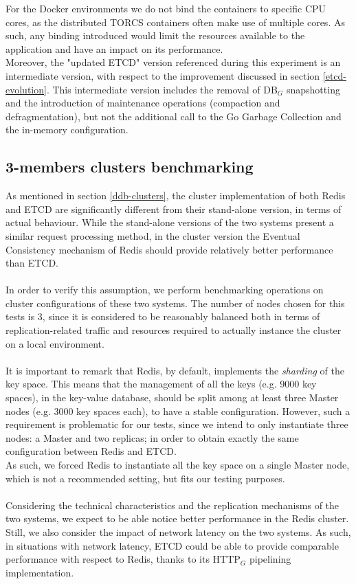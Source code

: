 For the Docker environments we do not bind the containers to specific CPU cores, as the distributed TORCS containers often make use of multiple cores. As such, any binding introduced would limit the resources available to the application and have an impact on its performance. \\
Moreover, the "updated ETCD" version referenced during this experiment is an intermediate version, with respect to the improvement discussed in section \ref{etcd-evolution}. This intermediate version includes the removal of DB$_G$ snapshotting and the introduction of maintenance operations (compaction and defragmentation), but not the additional call to the Go Garbage Collection and the in-memory configuration.

\subsection{3-members clusters benchmarking}\label{benchmarking}
As mentioned in section \ref{ddb-clusters}, the cluster implementation of both Redis and ETCD are significantly different from their stand-alone version, in terms of actual behaviour. While the stand-alone versions of the two systems present a similar request processing method, in the cluster version the Eventual Consistency mechanism of Redis should provide relatively better performance than ETCD. \\ \\
In order to verify this assumption, we perform benchmarking operations on cluster configurations of these two systems. The number of nodes chosen for this tests is 3, since it is considered to be reasonably balanced both in terms of replication-related traffic and resources required to actually instance the cluster on a local environment. \\ \\
It is important to remark that Redis, by default, implements the \textit{sharding} of the key space. This means that the management of all the keys (e.g. 9000 key spaces), in the key-value database, should be split among at least three Master nodes (e.g. 3000 key spaces each), to have a stable configuration. However, such a requirement is problematic for our tests, since we intend to only instantiate three nodes: a Master and two replicas; in order to obtain exactly the same configuration between Redis and ETCD. \\
As such, we forced Redis to instantiate all the key space on a single Master node, which is not a recommended setting, but fits our testing purposes. \\ \\
Considering the technical characteristics and the replication mechanisms of the two systems, we expect to be able notice better performance in the Redis cluster. Still, we also consider the impact of network latency on the two systems. As such, in situations with network latency, ETCD could be able to provide comparable performance with respect to Redis, thanks to its HTTP$_G$ pipelining implementation.

